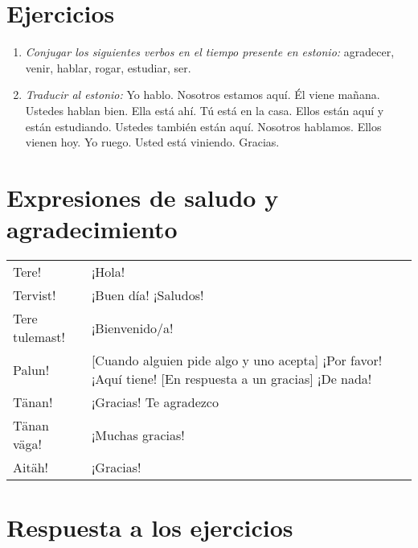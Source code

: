 \Large{\section*{Ejercicios}}

\begin{enumerate}
	\item \emph{Conjugar los siguientes verbos en el tiempo presente en estonio:} agradecer, venir, hablar, rogar, estudiar, ser.
	\item \emph{Traducir al estonio:} Yo hablo. Nosotros estamos aquí. Él viene mañana. Ustedes hablan bien. Ella está ahí. Tú está en la casa. Ellos están aquí y están estudiando. Ustedes también están aquí. Nosotros hablamos. Ellos vienen hoy. Yo ruego. Usted está viniendo. Gracias.
\end{enumerate}

\Large{\section*{Expresiones de saludo y agradecimiento}}

\begin{tabular}{ l p{8cm} }
	Tere!					& ¡Hola! \\
	Tervist!				& ¡Buen día! ¡Saludos! \\
	Tere tulemast! 			& ¡Bienvenido/a! \\
	Palun!					& \small{[Cuando alguien pide algo y uno acepta]} ¡Por favor! ¡Aquí tiene! \small{[En respuesta a un gracias]} ¡De nada! \\
	Tänan!					& ¡Gracias! Te agradezco \\
	Tänan väga! 			& ¡Muchas gracias! \\
	Aitäh!					& ¡Gracias!
\end{tabular}
\bigskip

\Large{\section*{Respuesta a los ejercicios}}

